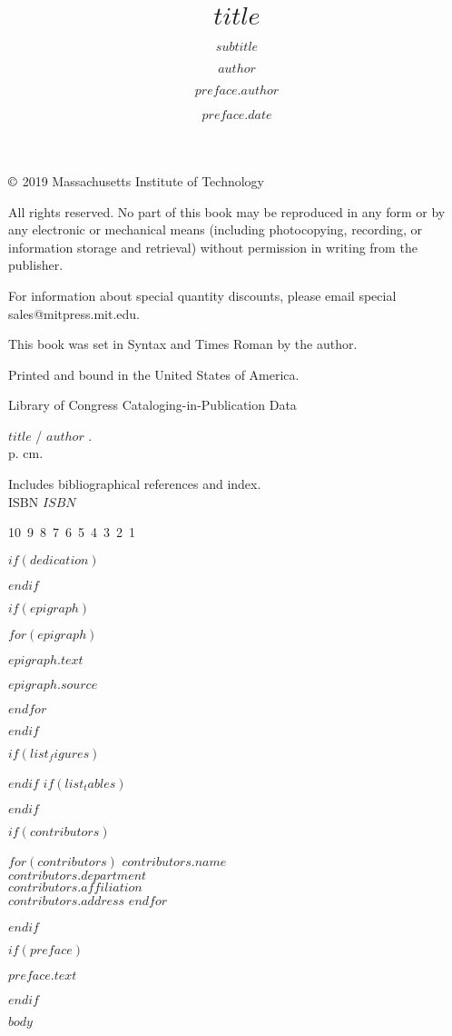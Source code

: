 \documentclass[$class_options$]{Linguistics}
\title{$title$}
\subtitle{$subtitle$}
\author{$author$}
\begin{document}
\halftitlepage

\titlepage

\begin{copyrightpage}

	\(\copyright\) 2019 Massachusetts Institute of Technology

	All rights reserved. No part of this book may be reproduced in
        any form or by any electronic or mechanical means (including
        photocopying, recording, or information storage and retrieval) without
        permission in writing from the publisher.

	For information about special quantity discounts, please email special sales@mitpress.mit.edu.

	This book was set in Syntax and Times Roman by the author.

	Printed and bound in the United States of America.

	Library of Congress Cataloging-in-Publication Data

	$title$ / $author$ .\\
	\hspace*{6pt} p. cm.

	Includes bibliographical references and index.\\
	ISBN $ISBN$
\vfill

10\ 9\ 8\ 7\ 6\ 5\ 4\ 3\ 2\ 1\

\end{copyrightpage}

$if(dedication)$
\dedication{$dedication$}
$endif$

$if(epigraph)$
  \begin{epigraphpage}
  $for(epigraph)$
    \epigraph{$epigraph.text$}{$epigraph.source$}
  $endfor$
  \end{epigraphpage}
$endif$

\tableofcontents
$if(list_figures)$\listoffigures$endif$
$if(list_tables)$\listoftables$endif$

$if(contributors)$
  \begin{contributors}
  $for(contributors)$
    \contrib
    $contributors.name$\\
    $contributors.department$\\
    $contributors.affiliation$\\
    $contributors.address$
  $endfor$
  \end{contributors}
$endif$

$if(preface)$
\begin{preface}
  $preface.text$
  \author{$preface.author$}
  \date{$preface.date$}
\end{preface}
$endif$

$body$

\endmatter



\end{document}
